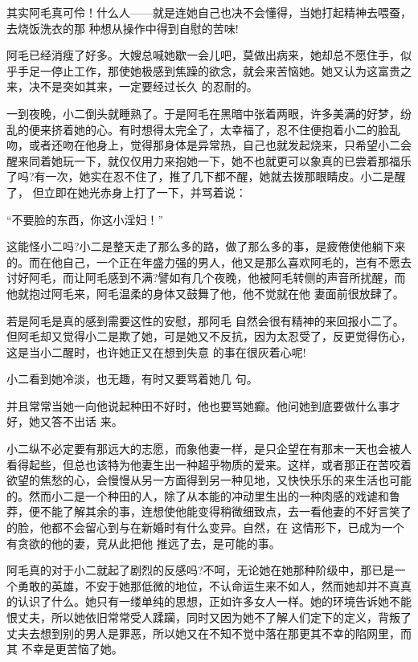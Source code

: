 \documentclass{article}
\begin{document}
其实阿毛真可伶！什么人——就是连她自己也决不会懂得，当她打起精神去喂蚕，去烧饭洗衣的那
种想从操作中得到自慰的苦味! 

阿毛已经消瘦了好多。大嫂总喊她歇一会儿吧，莫做出病来，她却总不愿住手，似乎手足一停止工作，那使她极感到焦躁的欲念，就会来苦恼她。她又认为这富贵之来，决不是突如其来，一定要经过长久
的忍耐的。 

\newpage

一到夜晚，小二倒头就睡熟了。于是阿毛在黑暗中张着两眼，许多美满的好梦，纷乱的便来挤着她的心。有时想得太完全了，太幸福了，忍不住便抱着小二的脸乱吻，或者还吻在他身上，觉得那身体是异常热，自己也就发起烧来，只希望小二会醒来同着她玩一下，就仅仅用力来抱她一下，她不也就更可以象真的已尝着那福乐了吗?有一次，她实在忍不住了，推了几下都不醒，她就去拨那眼睛皮。小二是醒了，
但立即在她光赤身上打了一下，并骂着说： 


“不要脸的东西，你这小淫妇！” 

这能怪小二吗?小二是整天走了那么多的路，做了那么多的事，是疲倦使他躺下来的。而在他自己，一个正在年盛力强的男人，他又是那么喜欢阿毛的，岂有不愿去讨好阿毛，而让阿毛感到不满?譬如有几个夜晚，他被阿毛转侧的声音所扰醒，而他就抱过阿毛来，阿毛温柔的身体又鼓舞了他，他不觉就在他
妻面前很放肆了。 

若是阿毛是真的感到需要这性的安慰，那阿毛
\newpage
自然会很有精神的来回报小二了。但阿毛却又觉得小二是欺了她，可是她又不反抗，因为太忍受了，反更觉得伤心，这是当小二醒时，也许她正又在想到失意
的事在很灰着心呢! 

小二看到她冷淡，也无趣，有时又要骂着她几
句。 

并且常常当她一向他说起种田不好时，他也要骂她癫。他问她到底要做什么事才好，她又答不出话
来。 

小二纵不必定要有那远大的志愿，而象他妻一样，是只企望在有那末一天也会被人看得起些，但总也该特为他妻生出一种超乎物质的爱来。这样，或者那正在苦咬着欲望的焦愁的心，会慢慢从另一方面得到另一种见地，又快快乐乐的来生活也可能的。然而小二是一个种田的人，除了从本能的冲动里生出的一种肉感的戏谑和鲁莽，便不能了解其余的事，连想使他能变得稍微细致点，去一看他妻的不好言笑了的脸，他都不会留心到与在新婚时有什么变异。自然，在
\newpage
这情形下，已成为一个有贪欲的他的妻，竞从此把他
推远了去，是可能的事。 


阿毛真的对于小二就起了剧烈的反感吗?不呵，无论她在她那种阶级中，那已是一个勇敢的英雄，不安于她那低微的地位，不认命运生来不如人，然而她却并不真真的认识了什么。她只有一缕单纯的思想，正如许多女人一样。她的环境告诉她不能恨丈夫，所以她依旧常常受人蹂躏，同时又因为她不了解人们定下的定义，背叛了丈夫去想到别的男人是罪恶，所以她又在不知不觉中落在那更其不幸的陷网里，而其
不幸是更苦恼了她。 
\end{document}
